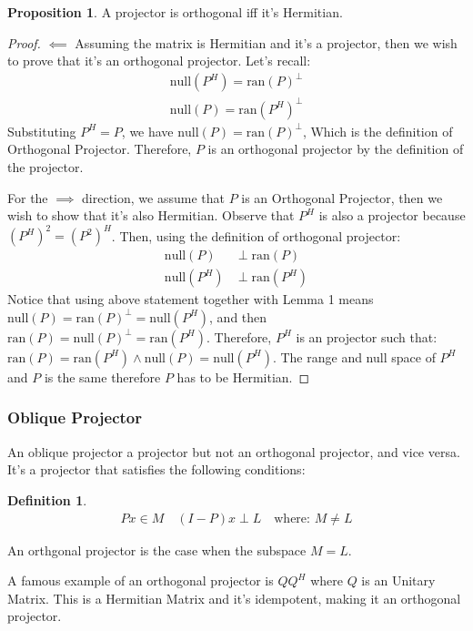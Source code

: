 \documentclass[]{article}
\theoremstyle{definition}
\newtheorem{prop}{Proposition}[section]  %
\newtheorem{definition}{Definition}
\begin{document}
            \begin{prop}
                A projector is orthogonal iff it's Hermitian. 
            \end{prop}
            \begin{proof}
                $\impliedby$ Assuming the matrix is Hermitian and it's a projector, then we wish to prove that it's an orthogonal projector. Let's recall: 
                \begin{align}
                    \text{null}(P^H) = \text{ran}(P)^{\perp}
                    \\
                    \text{null}(P) = \text{ran}(P^H)^{\perp}
                \end{align}
                Substituting $P^H = P$, we have $\text{null}(P) = \text{ran}(P)^{\perp}$, Which is the definition of Orthogonal Projector. Therefore, $P$ is an orthogonal projector by the definition of the projector. 
                \par
                For the $\implies$ direction, we assume that $P$ is an Orthogonal Projector, then we wish to show that it's also Hermitian. Observe that $P^H$ is also a projector because $(P^H)^2 = (P^2)^H$. Then, using the definition of orthogonal projector: 
                \begin{align}
                    \text{null}(P) &\perp\text{ran}(P) 
                    \\
                    \text{null}(P^H) &\perp \text{ran}(P^H)
                \end{align}
                Notice that using above statement together with Lemma 1 means $\text{null}(P) = \text{ran}(P)^\perp = \text{null}(P^H)$, and then $\text{ran}(P)=\text{null}(P)^\perp = \text{ran}(P^H)$. Therefore, $P^H$ is an projector such that: $\text{ran}(P) = \text{ran}(P^H) \wedge \text{null}(P) = \text{null}(P^H)$. The range and null space of $P^H$ and $P$ is the same therefore $P$ has to be Hermitian. 
            \end{proof}
            \subsubsection{Oblique Projector}
                An oblique projector a projector but not an orthogonal projector, and vice versa. It's a projector that satisfies the following conditions: 
                \begin{definition}
                    \begin{align}
                        Px \in M \quad (I - P)x \perp L \quad \text{where: } M \neq L
                    \end{align}    
                \end{definition}
                An orthgonal projector is the case when the subspace $M = L$. 
                \par
                A famous example of an orthogonal projector is $QQ^H$ where $Q$ is an Unitary Matrix. This is a Hermitian Matrix and it's idempotent, making it an orthogonal projector. 
\end{document}
